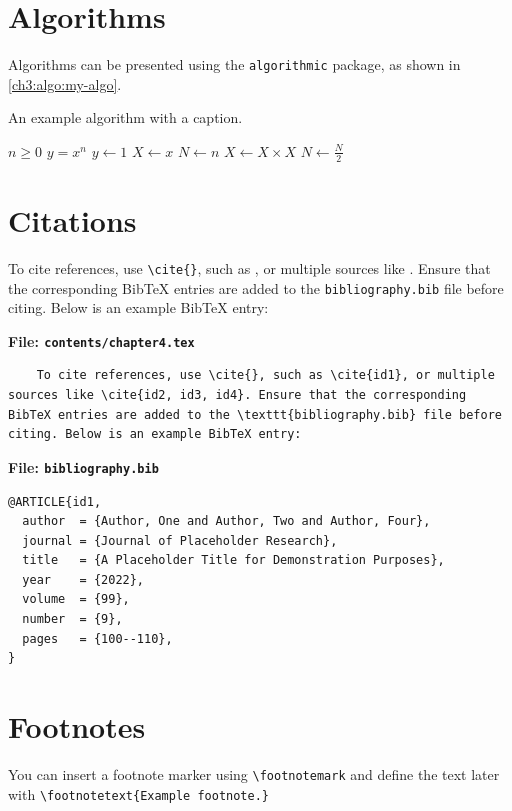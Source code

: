 \section{Algorithms}
\begin{paragraph}
Algorithms can be presented using the \texttt{algorithmic} package, as shown in \autoref{ch3:algo:my-algo}.
\end{paragraph}

\begin{algorithm}[h]
\caption{An example algorithm with a caption.}
\label{ch3:algo:my-algo}
\small\singlespacing
\begin{algorithmic}[1]
    \Require $n \geq 0$
    \Ensure $y = x^n$
    \State $y \gets 1$
    \State $X \gets x$
    \State $N \gets n$
            \State $X \gets X \times X$
            \State $N \gets \frac{N}{2}$ 
    \EndWhile
\end{algorithmic}
\end{algorithm}



\section{Citations}
\begin{paragraph}
To cite references, use \verb|\cite{}|, such as \cite{id1}, or multiple sources like \cite{id2, id3, id4}. Ensure that the corresponding BibTeX entries are added to the \texttt{bibliography.bib} file before citing. Below is an example BibTeX entry:
\end{paragraph}

\noindent\textbf{File: \texttt{contents/chapter4.tex}}\vspace{-1em}
\begin{verbatim}
    To cite references, use \cite{}, such as \cite{id1}, or multiple sources like \cite{id2, id3, id4}. Ensure that the corresponding BibTeX entries are added to the \texttt{bibliography.bib} file before citing. Below is an example BibTeX entry:
\end{verbatim}

\newpage

\noindent\textbf{File: \texttt{bibliography.bib}}\vspace{-1em}
\begin{verbatim}
@ARTICLE{id1,
  author  = {Author, One and Author, Two and Author, Four},
  journal = {Journal of Placeholder Research}, 
  title   = {A Placeholder Title for Demonstration Purposes}, 
  year    = {2022},
  volume  = {99},
  number  = {9},
  pages   = {100--110},
}
\end{verbatim}

\section{Footnotes}
\begin{paragraph}
You can insert a footnote marker using \verb|\footnotemark|\footnotemark{} and define the text later with \verb|\footnotetext{Example footnote.}|
\end{paragraph}